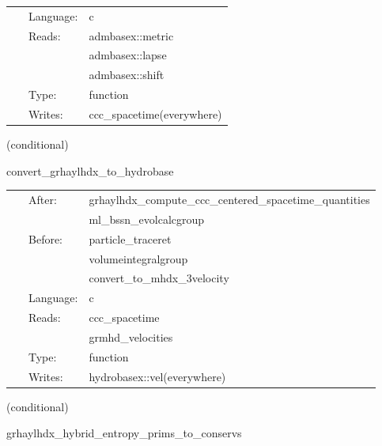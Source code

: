 \documentclass{article}
\begin{document}
\hspace{5mm}{\it interpolate spacetime quantities to cell centers } 


\hspace{5mm}

 \begin{tabular*}{160mm}{cll} 
~ & Language:  & c \\ 
~ & Reads:  & admbasex::metric \\ 
~& ~ &admbasex::lapse\\ 
~& ~ &admbasex::shift\\ 
~ & Type:  & function \\ 
~ & Writes:  & ccc\_spacetime(everywhere) \\ 
\end{tabular*} 


\vspace{5mm}

   (conditional) 

\hspace{5mm} convert\_grhaylhdx\_to\_hydrobase 

\hspace{5mm}{\it convert grhaylhdx variables to hydrobasex } 


\hspace{5mm}

 \begin{tabular*}{160mm}{cll} 
~ & After:  & grhaylhdx\_compute\_ccc\_centered\_spacetime\_quantities \\ 
~& ~ &ml\_bssn\_evolcalcgroup\\ 
~ & Before:  & particle\_traceret \\ 
~& ~ &volumeintegralgroup\\ 
~& ~ &convert\_to\_mhdx\_3velocity\\ 
~ & Language:  & c \\ 
~ & Reads:  & ccc\_spacetime \\ 
~& ~ &grmhd\_velocities\\ 
~ & Type:  & function \\ 
~ & Writes:  & hydrobasex::vel(everywhere) \\ 
\end{tabular*} 


\vspace{5mm}

   (conditional) 

\hspace{5mm} grhaylhdx\_hybrid\_entropy\_prims\_to\_conservs 
\end{document}
